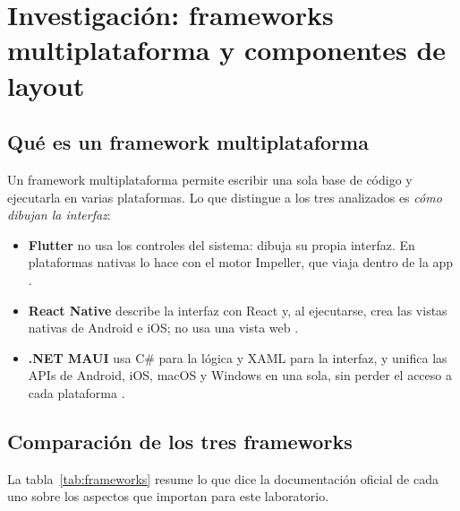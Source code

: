 \section{Investigación: frameworks multiplataforma y componentes de layout}
\label{sec:investigacion}

\subsection{Qué es un framework multiplataforma}
Un framework multiplataforma permite escribir una sola base de código y ejecutarla en varias plataformas. Lo que distingue a los tres analizados es \emph{cómo dibujan la interfaz}:
\begin{itemize}
	\item \textbf{Flutter} no usa los controles del sistema: dibuja su propia interfaz. En plataformas nativas lo hace con el motor Impeller, que viaja dentro de la app \cite{flutterarq}.
	\item \textbf{React Native} describe la interfaz con React y, al ejecutarse, crea las vistas nativas de Android e iOS; no usa una vista web \cite{rncomp}.
	\item \textbf{.NET MAUI} usa C\# para la lógica y XAML para la interfaz, y unifica las APIs de Android, iOS, macOS y Windows en una sola, sin perder el acceso a cada plataforma \cite{mauiwhat}.
\end{itemize}

\subsection{Comparación de los tres frameworks}
La tabla~\ref{tab:frameworks} resume lo que dice la documentación oficial de cada uno sobre los aspectos que importan para este laboratorio.

